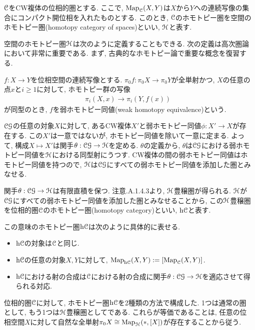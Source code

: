 \documentclass[uplatex, a4paper, 14Q, dvipdfmx]{jsreport}
\begin{document}
\begin{example}[空間のホモトピー圏] \label{eg.1.1.3.3}
  $\mathcal{C}$をCW複体の位相的圏とする. 
  ここで, $\mathrm{Map}_{\mathcal{C}}(X,Y)$は$X$から$Y$への連続写像の集合にコンパクト開位相を入れたものとする. 
  このとき, $\mathcal{C}$のホモトピー圏を空間のホモトピー圏(homotopy category of spaces)といい, $\mathcal{H}$と表す. 
\end{example}

空間のホモトピー圏$\mathcal{H}$は次のように定義することもできる. 
次の定義は高次圏論において非常に重要である. 
まず, 古典的なホモトピー論で重要な概念を復習する. 

\begin{definition} \label{def.1.1.3.4}
  $f : X \to Y$を位相空間の連続写像とする. 
  $\pi_0f : \pi_0X \to \pi_0Y$が全単射かつ, $X$の任意の点$x$と$i \geq 1$に対して, ホモトピー群の写像
  \begin{align*}
    \pi_i(X,x) \to \pi_i(Y,f(x))
  \end{align*}
  が同型のとき, $f$を弱ホモトピー同値(weak homotopy equivalence)という. 
\end{definition}

$\mathcal{CG}$の任意の対象$X$に対して, あるCW複体$X'$と弱ホモトピー同値$\phi : X' \to X$が存在する. 
この$X'$は一意ではないが, ホモトピー同値を除いて一意に定まる. 
よって, 構成$X \mapsto X'$は関手$\theta : \mathcal{CG} \to \mathcal{H}$を定める. 
$\theta$の定義から, $\theta$は$\mathcal{CG}$における弱ホモトピー同値を$\mathcal{H}$における同型射にうつす. 
CW複体の間の弱ホモトピー同値はホモトピー同値を持つので, $\mathcal{H}$は$\mathcal{CG}$にすべての弱ホモトピー同値を添加した圏とみなせる. 

関手$\theta : \mathcal{CG} \to \mathcal{H}$は有限直積を保つ. 
注意.A.1.4.3より, $\mathcal{H}$豊穣圏が得られる. 
$\mathcal{H}$が$\mathcal{CG}$にすべての弱ホモトピー同値を添加した圏とみなせることから, この$\mathcal{H}$豊穣圏を位相的圏$\mathcal{C}$のホモトピー圏(homotopy category)といい, $\mathrm{h}\mathcal{C}$と表す. 

この意味のホモトピー圏$\mathrm{h}\mathcal{C}$は次のように具体的に表せる. 
\begin{itemize}
  \item $\mathrm{h}\mathcal{C}$の対象は$\mathcal{C}$と同じ.
  \item $\mathrm{h}\mathcal{C}$の任意の対象$X,Y$に対して, $\mathrm{Map}_{\mathrm{h}\mathcal{C}}(X,Y) := [\mathrm{Map}_{\mathcal{C}}(X,Y)]$.
  \item $\mathrm{h}\mathcal{C}$における射の合成は$\mathcal{C}$における射の合成に関手$\theta : \mathcal{CG} \to \mathcal{H}$を適応させて得られる対応.
\end{itemize}

\begin{remark} \label{rem.1.1.3.5}
  位相的圏$\mathcal{C}$に対して, ホモトピー圏$\mathrm{h}\mathcal{C}$を2種類の方法で構成した. 
  1つは通常の圏として, もう1つは$\mathcal{H}$豊穣圏としてである. 
  これらが等価であることは, 任意の位相空間$X$に対して自然な全単射$\pi_0X \cong \mathrm{Map}_{\mathcal{H}}(\ast,[X])$が存在することから従う.
\end{remark}
\end{document}
